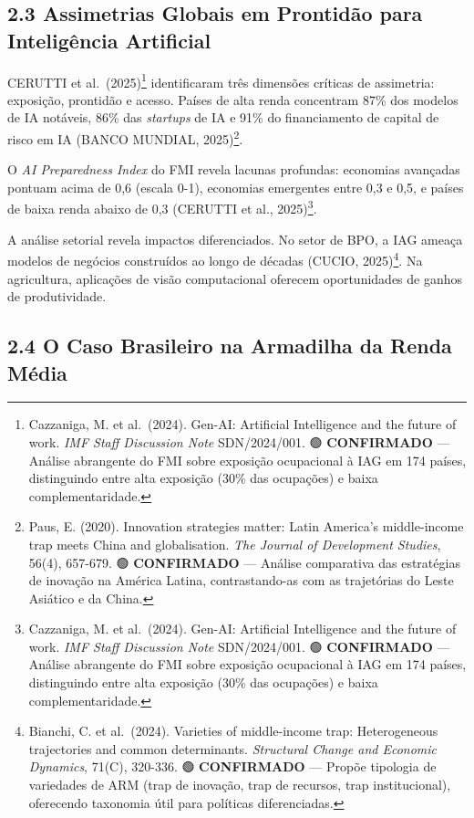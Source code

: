 \documentclass[
  brazilian,
  12pt,
]{article}
\begin{document}
\subsection{2.3 Assimetrias Globais em Prontidão para Inteligência Artificial}\label{assimetrias-globais-em-prontiduxe3o-para-inteliguxeancia-artificial}

CERUTTI et al.~(2025)\footnote{Cazzaniga, M. et al.~(2024). Gen-AI: Artificial Intelligence and the future of work. \emph{IMF Staff Discussion Note} SDN/2024/001. 🟢 \textbf{CONFIRMADO} --- Análise abrangente do FMI sobre exposição ocupacional à IAG em 174 países, distinguindo entre alta exposição (30\% das ocupações) e baixa complementaridade.} identificaram três dimensões críticas de assimetria: exposição, prontidão e acesso. Países de alta renda concentram 87\% dos modelos de IA notáveis, 86\% das \emph{startups} de IA e 91\% do financiamento de capital de risco em IA (BANCO MUNDIAL, 2025)\footnote{Paus, E. (2020). Innovation strategies matter: Latin America's middle-income trap meets China and globalisation. \emph{The Journal of Development Studies}, 56(4), 657-679. 🟢 \textbf{CONFIRMADO} --- Análise comparativa das estratégias de inovação na América Latina, contrastando-as com as trajetórias do Leste Asiático e da China.}.

O \emph{AI Preparedness Index} do FMI revela lacunas profundas: economias avançadas pontuam acima de 0,6 (escala 0-1), economias emergentes entre 0,3 e 0,5, e países de baixa renda abaixo de 0,3 (CERUTTI et al., 2025)\footnote{Cazzaniga, M. et al.~(2024). Gen-AI: Artificial Intelligence and the future of work. \emph{IMF Staff Discussion Note} SDN/2024/001. 🟢 \textbf{CONFIRMADO} --- Análise abrangente do FMI sobre exposição ocupacional à IAG em 174 países, distinguindo entre alta exposição (30\% das ocupações) e baixa complementaridade.}.

A análise setorial revela impactos diferenciados. No setor de BPO, a IAG ameaça modelos de negócios construídos ao longo de décadas (CUCIO, 2025)\footnote{Bianchi, C. et al.~(2024). Varieties of middle-income trap: Heterogeneous trajectories and common determinants. \emph{Structural Change and Economic Dynamics}, 71(C), 320-336. 🟢 \textbf{CONFIRMADO} --- Propõe tipologia de variedades de ARM (trap de inovação, trap de recursos, trap institucional), oferecendo taxonomia útil para políticas diferenciadas.}. Na agricultura, aplicações de visão computacional oferecem oportunidades de ganhos de produtividade.

\subsection{2.4 O Caso Brasileiro na Armadilha da Renda Média}\label{o-caso-brasileiro-na-armadilha-da-renda-muxe9dia}
\end{document}
